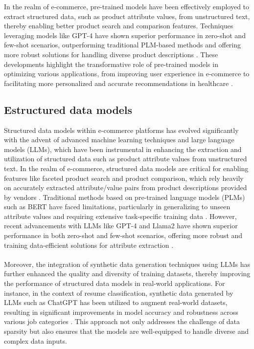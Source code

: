In the realm of e-commerce, pre-trained models have been effectively employed to extract structured data, such as product attribute values, from unstructured text, thereby enabling better product search and comparison features. Techniques leveraging models like GPT-4 have shown superior performance in zero-shot and few-shot scenarios, outperforming traditional PLM-based methods and offering more robust solutions for handling diverse product descriptions \cite{brinkmann2024product}. These developments highlight the transformative role of pre-trained models in optimizing various applications, from improving user experience in e-commerce to facilitating more personalized and accurate recommendations in healthcare \cite{labrak2024biomistral}.

\subsection*{Estructured data models}
Structured data models within e-commerce platforms has evolved significantly with the advent of advanced machine learning techniques and large language models (LLMs), which have been instrumental in enhancing the extraction and utilization of structured data such as product attribute values from unstructured text. In the realm of e-commerce, structured data models are critical for enabling features like faceted product search and product comparison, which rely heavily on accurately extracted attribute/value pairs from product descriptions provided by vendors \cite{brinkmann2024product}. Traditional methods based on pre-trained language models (PLMs) such as BERT have faced limitations, particularly in generalizing to unseen attribute values and requiring extensive task-specific training data \cite{brinkmann2024product}. However, recent advancements with LLMs like GPT-4 and Llama2 have shown superior performance in both zero-shot and few-shot scenarios, offering more robust and training data-efficient solutions for attribute extraction \cite{brinkmann2024product}. 
\\\\
Moreover, the integration of synthetic data generation techniques using LLMs has further enhanced the quality and diversity of training datasets, thereby improving the performance of structured data models in real-world applications. For instance, in the context of resume classification, synthetic data generated by LLMs such as ChatGPT has been utilized to augment real-world datasets, resulting in significant improvements in model accuracy and robustness across various job categories \cite{skondras2023generating}. This approach not only addresses the challenge of data sparsity but also ensures that the models are well-equipped to handle diverse and complex data inputs. 
